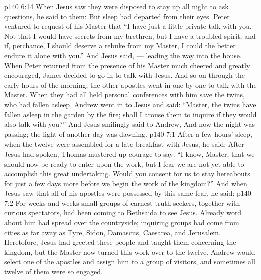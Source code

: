 \vs p140 6:14 When Jesus saw they were disposed to stay up all night to ask questions, he said to them:  But sleep had departed from their eyes. Peter ventured to request of his Master that “I have just a little private talk with you. Not that I would have secrets from my brethren, but I have a troubled spirit, and if, perchance, I should deserve a rebuke from my Master, I could the better endure it alone with you.” And Jesus said,  --- leading the way into the house. When Peter returned from the presence of his Master much cheered and greatly encouraged, James decided to go in to talk with Jesus. And so on through the early hours of the morning, the other apostles went in one by one to talk with the Master. When they had all held personal conferences with him save the twins, who had fallen asleep, Andrew went in to Jesus and said: “Master, the twins have fallen asleep in the garden by the fire; shall I arouse them to inquire if they would also talk with you?” And Jesus smilingly said to Andrew,  And now the night was passing; the light of another day was dawning.
\vs p140 7:1 After a few hours’ sleep, when the twelve were assembled for a late breakfast with Jesus, he said:  After Jesus had spoken, Thomas mustered up courage to say: “I know, Master, that we should now be ready to enter upon the work, but I fear we are not yet able to accomplish this great undertaking. Would you consent for us to stay hereabouts for just a few days more before we begin the work of the kingdom?” And when Jesus saw that all of his apostles were possessed by this same fear, he said: 
\vs p140 7:2 \pc For weeks and weeks small groups of earnest truth seekers, together with curious spectators, had been coming to Bethsaida to see Jesus. Already word about him had spread over the countryside; inquiring groups had come from cities as far away as Tyre, Sidon, Damascus, Caesarea, and Jerusalem. Heretofore, Jesus had greeted these people and taught them concerning the kingdom, but the Master now turned this work over to the twelve. Andrew would select one of the apostles and assign him to a group of visitors, and sometimes all twelve of them were so engaged.
